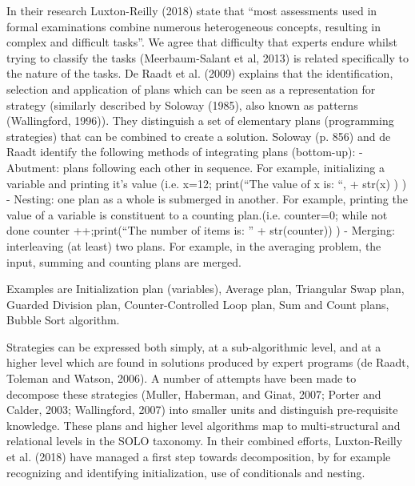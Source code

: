 In their research Luxton-Reilly (2018) state that “most assessments used in formal examinations combine numerous heterogeneous concepts, resulting in complex and difficult tasks”. We agree that difficulty that experts endure whilst trying to classify the tasks (Meerbaum-Salant et al, 2013) is related specifically to the nature of the tasks. De Raadt et al. (2009) explains that the identification, selection and application of plans which can be seen as a representation for strategy (similarly described by Soloway (1985), also known as patterns (Wallingford, 1996)). They distinguish a set of elementary plans (programming strategies) that can be combined to create a solution. Soloway (p. 856) and de Raadt identify the following methods of integrating plans (bottom-up):
-	Abutment: plans following each other in sequence. For example, initializing a variable and printing it’s value (i.e. x=12; print(“The value of x is: “, + str(x) ) )
-	Nesting: one plan as a whole is submerged in another. For example, printing the value of a variable is constituent to a counting plan.(i.e. counter=0; while not done counter ++;print(“The number of items is: ” + str(counter)) )
-	Merging: interleaving (at least) two plans. For example, in the averaging problem, the input, summing and counting plans are merged.


Examples are Initialization plan (variables), Average plan, Triangular Swap plan, Guarded Division plan, Counter-Controlled Loop plan, Sum and Count plans, Bubble Sort algorithm.

Strategies can be expressed both simply, at a sub-algorithmic level, and at a higher level which are found in solutions produced by expert programs (de Raadt, Toleman and Watson, 2006). A number of attempts have been made to decompose these strategies (Muller, Haberman, and Ginat, 2007; Porter and Calder, 2003; Wallingford, 2007) into  smaller units and distinguish pre-requisite knowledge. These plans and higher level algorithms map to multi-structural and relational levels in the SOLO taxonomy. In their combined efforts, Luxton-Reilly et al. (2018) have managed a first step towards decomposition, by for example recognizing and identifying initialization, use of conditionals and nesting.  




